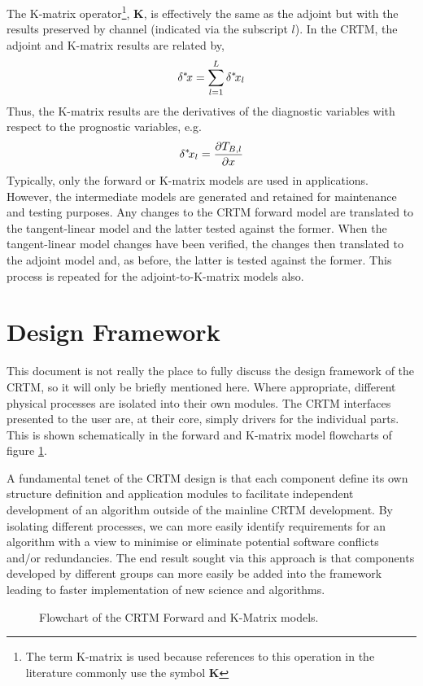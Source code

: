 The K-matrix operator\footnote{The term K-matrix is used because references to this operation in the literature commonly use the symbol $\mathbf{K}$}, $\mathbf{K}$, is effectively the same as the adjoint but with the results preserved by channel (indicated via the subscript $l$). In the CRTM, the adjoint and K-matrix results are related by,
\begin{equation}
  \delta^{*}\!{x} = \sum_{l=1}^{L}\delta^{*}\!{x}_l
\end{equation}
Thus, the K-matrix results are the derivatives of the diagnostic variables with respect to the prognostic variables, e.g.
\begin{equation}
  \delta^{*}\!{x_{l}} = \frac{\partial{T_{B,l}}}{\partial{x}}
\end{equation}
Typically, only the forward or K-matrix models are used in applications. However, the intermediate models are generated and retained for maintenance and testing purposes. Any changes to the CRTM forward model are translated to the tangent-linear model and the latter tested against the former. When the tangent-linear model changes have been verified, the changes then translated to the adjoint model and, as before, the latter is tested against the former. This process is repeated for the adjoint-to-K-matrix models also.


\section{Design Framework}
This document is not really the place to fully discuss the design framework of the CRTM, so it will only be briefly mentioned here. Where appropriate, different physical processes are isolated into their own modules. The CRTM interfaces presented to the user are, at their core, simply drivers for the individual parts. This is shown schematically in the forward and K-matrix model flowcharts of figure \ref{fig:fwd_k_flowchart}.

A fundamental tenet of the CRTM design is that each component define its own structure definition and application modules to facilitate independent development of an algorithm outside of the mainline CRTM development. By isolating different processes, we can more easily identify requirements for an algorithm with a view to minimise or eliminate potential software conflicts and/or redundancies. The end result sought via this approach is that components developed by different groups can more easily be added into the framework leading to faster implementation of new science and algorithms.

\begin{figure}[htp]
  \centering
  
  \caption{Flowchart of the CRTM Forward and K-Matrix models.}
  \label{fig:fwd_k_flowchart}
\end{figure}


